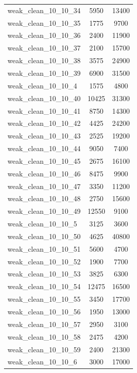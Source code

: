 \begin{longtable}{lcc}
weak\_clean\_10\_10\_34    &     5950 &  13400 \\
weak\_clean\_10\_10\_35    &     1775 &   9700 \\
weak\_clean\_10\_10\_36    &     2400 &  11900 \\
weak\_clean\_10\_10\_37    &     2100 &  15700 \\
weak\_clean\_10\_10\_38    &     3575 &  24900 \\
weak\_clean\_10\_10\_39    &     6900 &  31500 \\
weak\_clean\_10\_10\_4     &     1575 &   4800 \\
weak\_clean\_10\_10\_40    &    10425 &  31300 \\
weak\_clean\_10\_10\_41    &     8750 &  14300 \\
weak\_clean\_10\_10\_42    &     4425 &  24200 \\
weak\_clean\_10\_10\_43    &     2525 &  19200 \\
weak\_clean\_10\_10\_44    &     9050 &   7400 \\
weak\_clean\_10\_10\_45    &     2675 &  16100 \\
weak\_clean\_10\_10\_46    &     8475 &   9900 \\
weak\_clean\_10\_10\_47    &     3350 &  11200 \\
weak\_clean\_10\_10\_48    &     2750 &  15600 \\
weak\_clean\_10\_10\_49    &    12550 &   9100 \\
weak\_clean\_10\_10\_5     &     3125 &   3600 \\
weak\_clean\_10\_10\_50    &     4625 &  40800 \\
weak\_clean\_10\_10\_51    &     5600 &   4700 \\
weak\_clean\_10\_10\_52    &     1900 &   7700 \\
weak\_clean\_10\_10\_53    &     3825 &   6300 \\
weak\_clean\_10\_10\_54    &    12475 &  16500 \\
weak\_clean\_10\_10\_55    &     3450 &  17700 \\
weak\_clean\_10\_10\_56    &     1950 &  13000 \\
weak\_clean\_10\_10\_57    &     2950 &   3100 \\
weak\_clean\_10\_10\_58    &     2475 &   4200 \\
weak\_clean\_10\_10\_59    &     2400 &  21300 \\
weak\_clean\_10\_10\_6     &     3000 &  17000 \\

\end{longtable}
